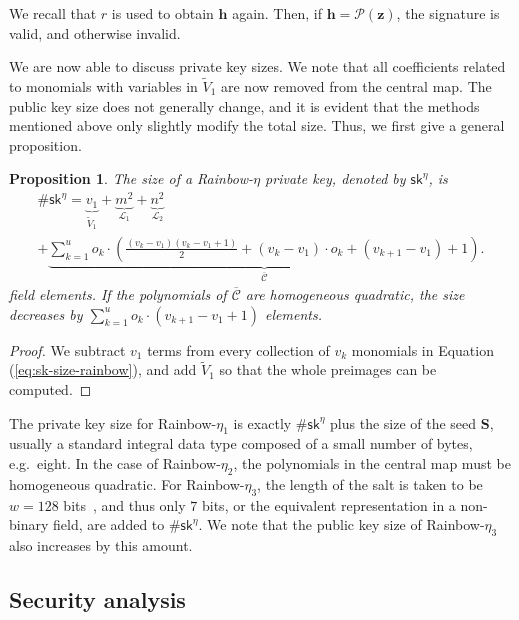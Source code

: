 \documentclass[english]{ufsc-thesis-rn46-2019/ufsc-thesis-rn46-2019}
\newtheorem{proposition}[theorem]{Proposition}
\theoremstyle{definition}
\begin{document}
We recall that $r$ is used to obtain $\mathbf{h}$ again. Then, if
$\mathbf{h} = \mathcal{P}(\mathbf{z})$, the signature is valid, and otherwise
invalid.

We are now able to discuss private key sizes. We note that all coefficients
related to monomials with variables in $\widetilde{V}_{1}$ are now removed from
the central map. The public key size does not generally change, and it is
evident that the methods mentioned above only slightly modify the total
size. Thus, we first give a general proposition.

\begin{proposition}\label{prop:eta-key-size}
  The size of a Rainbow-$\eta$ private key, denoted by $\mathsf{sk}^{\eta}$, is
  \begin{multline}
    \#\mathsf{sk}^{\eta} = \underbrace{v_{1}}_{\widetilde{V}_{1}}
      + \underbrace{m^{2}}_{\mathcal{L}_{1}}
      + \underbrace{n^{2}}_{\mathcal{L}_{2}} \\
      + \underbrace{\sum_{k = 1}^{u} o_{k} \cdot \left(
          \frac{(v_{k} - v_{1})(v_{k} - v_{1} + 1)}{2} + (v_{k} - v_{1})
            \cdot o_{k} + (v_{k + 1} - v_{1}) + 1
        \right)}_{\overline{\mathcal{C}}}.
  \end{multline}
  field elements. If the polynomials of $\overline{\mathcal{C}}$ are
  homogeneous quadratic, the size decreases by
  $\sum_{k = 1}^{u} o_{k} \cdot (v_{k + 1} - v_{1} + 1)$ elements.
\end{proposition}
\begin{proof}
  We subtract $v_{1}$ terms from every collection of $v_{k}$ monomials in
  Equation (\ref{eq:sk-size-rainbow}), and add $\widetilde{V}_{1}$ so that the
  whole preimages can be computed.
\end{proof}

The private key size for Rainbow-$\eta_{1}$ is exactly $\#\mathsf{sk}^{\eta}$
plus the size of the seed $\mathbf{S}$, usually a standard integral data type
composed of a small number of bytes, e.g.\ eight. In the case of
Rainbow-$\eta_{2}$, the polynomials in the central map must be homogeneous
quadratic. For Rainbow-$\eta_{3}$, the length of the salt is taken to be
$w = 128$ bits~\cite[p.~11]{Ding:201901}, and thus only $7$ bits, or the
equivalent representation in a non-binary field, are added to
$\#\mathsf{sk}^{\eta}$. We note that the public key size of Rainbow-$\eta_{3}$
also increases by this amount.

\subsection{Security analysis}\label{subsec:analysis}
\end{document}
